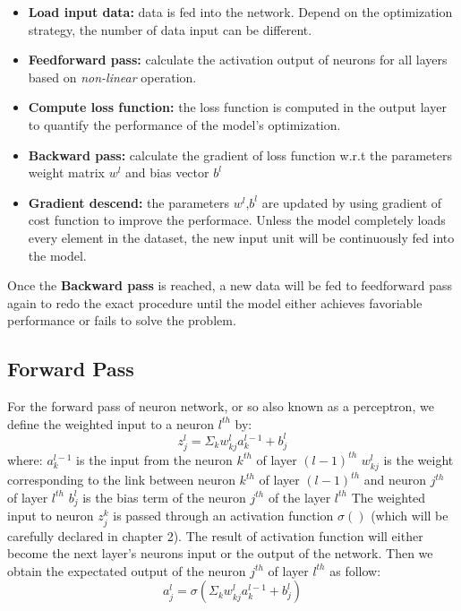 \begin{itemize}
	\item \textbf{Load input data:} data is fed into the network. Depend on the optimization strategy, the number of data input can be different.
	\item \textbf{Feedforward pass:} calculate the activation output of neurons for all layers based on \textit{non-linear} operation.
	\item \textbf{Compute loss function:} the loss function is computed in the output layer to quantify the performance of the model's optimization.
	\item \textbf{Backward pass:} calculate the gradient of loss function w.r.t the parameters weight matrix $w^{l}$ and bias vector $b^{l}$
	\item \textbf{Gradient descend:} the parameters $w^{l}$,$b^{l}$ are updated by using gradient of cost function to improve the performace. Unless the model completely loads every element in the dataset, the new input unit will be continuously fed into the model.
\end{itemize}
Once the \textbf{Backward pass} is reached, a new data will be fed to feedforward pass again to redo the exact procedure until the model either achieves favoriable performance or fails to solve the problem.

\subsection{Forward Pass}
For the forward pass of neuron network, or so also known as a perceptron, we define the weighted input to a neuron $l^{th}$ by:
\begin{equation}
	z^{l}_{j} = \Sigma_{k} w^{l}_{kj}a^{l-1}_{k} + b^{l}_{j}
\end{equation}
where:\newline
$a^{l-1}_{k}$ is the input from the neuron $k^{th}$ of layer $(l-1)^{th}$\newline
$w^{l}_{kj}$ is the weight corresponding to the link between neuron $k^{th}$ of layer $(l-1)^{th}$ and neuron $j^{th}$ of layer $l^{th}$\newline
$b^{l}_{j}$ is the bias term of the neuron $j^{th}$ of the layer $l^{th}$\newline
\newline
The weighted input to neuron $z^{k}_{j}$ is passed through an activation function $\sigma()$ (which will be carefully declared in chapter 2). The result of activation function will either become the next layer's neurons input or the output of the network. Then we obtain the expectated output of the neuron $j^{th}$ of layer $l^{th}$ as follow:
\begin{equation}\label{eq:neuron_output}
	a^{l}_{j} = \sigma\left(\Sigma_{k} w^{l}_{kj}a^{l-1}_{k} + b^{l}_{j}\right)
\end{equation}

